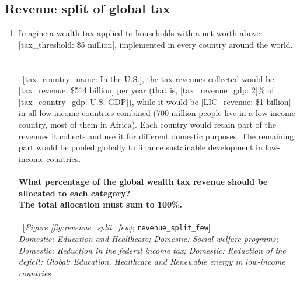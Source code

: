  \subsection*{Revenue split of global tax} 
 \begin{enumerate}[resume] 
\item  \label{q:revenue_split_few} Imagine a wealth tax applied to households with a net worth above [tax\_threshold: \$5 million], implemented in every country around the world.
~\\\\ 
~[tax\_country\_name: In the U.S.], the tax revenues collected would be [tax\_revenue: \$514 billion] per year (that is, [tax\_revenue\_gdp: 2]\% of [tax\_country\_gdp: U.S. GDP]), while it would be [LIC\_revenue: \$1 billion] in all low-income countries combined (700 million people live in a low-income country, most of them in Africa).
Each country would retain part of the revenues it collects and use it for different domestic purposes. The remaining part would be pooled globally to finance sustainable development in low-income countries.
~\\\\\textbf{What percentage of the global wealth tax revenue should be allocated to each category?} \\\textbf{The total allocation must sum to 100\%.}\\\\ 
~[\textit{Figure \ref{fig:revenue_split_few}}; 
\verb|revenue_split_few|]
  \\ \textit{Domestic: Education and Healthcare; Domestic: Social welfare programs; Domestic: Reduction in the federal income tax; Domestic: Reduction of the deficit; Global: Education, Healthcare and Renewable energy in low-income countries}


\end{enumerate}
